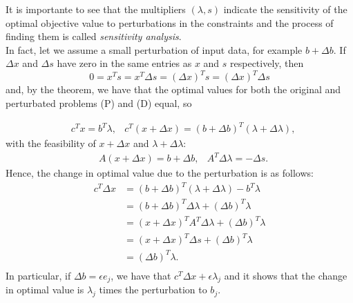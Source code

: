 \documentclass[a4paper,10 pt,titlepage,twoside]{book}
\theoremstyle{plain}
\theoremstyle{definition}
\theoremstyle{remark}
\begin{document}
It is importante to see that the multipliers $(\lambda,s)$ indicate the sensitivity of the optimal objective value to perturbations in the constraints and the process of finding them is called \textit{sensitivity analysis}. \\ In fact, let we assume a small perturbation of input data, for example $b + \Delta b$. If $\Delta x$ and $\Delta s$ have zero in the same entries as $x$ and $s$ respectively, then
\begin{equation*}
0=x^{T}s=x^{T}\Delta s= \left( \Delta x\right)^{T}s=\left( \Delta x\right)^{T}\Delta s
\end{equation*}
and, by the theorem, we have that the optimal values for both the original and perturbated problems (P) and (D) equal, so

\begin{align*}
&c^{T}x=b^{T}\lambda,  &c^{T}(x + \Delta x)=\left(b+\Delta b\right)^{T}\left(\lambda+\Delta \lambda\right),
\end{align*}
with the feasibility of $x + \Delta x$ and $\lambda+\Delta \lambda$:
\begin{align*}
&A(x + \Delta x)=b+\Delta b,
&A^{T}\Delta\lambda=-\Delta s.
\end{align*}
Hence, the change in optimal value due to the perturbation is as follows:
\begin{align*}
c^{T}\Delta x&=\left(b+\Delta b\right)^{T}\left(\lambda+\Delta \lambda\right) - b^{T}\lambda\\
&=\left(b+\Delta b\right)^{T}\Delta \lambda+\left(\Delta b\right)^{T}\lambda\\
&=\left(x+\Delta x\right)^{T}A^{T}\Delta \lambda+\left(\Delta b\right)^{T}\lambda\\
&=\left(x+\Delta x\right)^{T}\Delta s+\left(\Delta b\right)^{T}\lambda\\
&=\left(\Delta b\right)^{T}\lambda.\\
\end{align*} 
In particular, if $\Delta b = \epsilon e_{j}$, we have that $c^{T}\Delta x+\epsilon \lambda_{j}$ and it shows that the change in optimal value is $\lambda_{j}$ times the perturbation to $b_{j}$.

%
%
\end{document}
